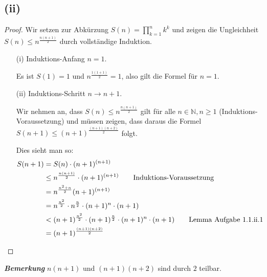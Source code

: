 \documentclass{article}
\begin{document}
\subsection*{(ii)}
\begin{proof}
  Wir setzen zur Abkürzung \(S(n)=\prod_{k=1}^n{k^k}\) und zeigen die
  Ungleichheit \(S(n) \leq n^{\frac{n(n+1)}{2}}\) durch vollständige
  Induktion.

\begin{itemize}
\item[(i)] Induktions-Anfang \(n=1\).

  Es ist \(S(1)=1\) und \(n^{\frac{1(1+1)}{2}} = 1\), also gilt die Formel für \(n=1\).
\item[(ii)] Induktions-Schritt \(n \rightarrow n+1\).

  Wir nehmen an, dass \(S(n)\leq n^{\frac{n(n+1)}{2}}\) gilt für alle
  \(n \in \mathbb{N}, n \geq 1\) (Induktions-Voraussetzung) und müssen
  zeigen, dass daraus die Formel \(S(n+1) \leq (n+1)^{\frac{(n+1)(n+2)}{2}}\)
  folgt.

  Dies sieht man so:
\begin{align*}
  S(n+1) &= S(n) \cdot (n+1)^{(n+1)} \\
         &\leq n^{\frac{n(n+1)}{2}} \cdot (n+1)^{(n+1)}
           \tag*{Induktions-Voraussetzung} \\
         &= n^{\frac{n^2+n}{2}}(n+1)^{(n+1)} \\
  &= n^{\frac{n^2}{2}} \cdot n^{\frac{n}{2}} \cdot (n+1)^n \cdot (n+1)
  \\
  &< (n+1)^{\frac{n^2}{2}} \cdot (n+1)^{\frac{n}{2}} \cdot (n+1)^n
    \cdot (n+1) \tag*{\text{Lemma Aufgabe 1.1.ii.1}}\\
  &= (n+1)^{\frac{(n+1)(n+2)}{2}}
\end{align*}
\end{itemize}
\end{proof}

\textbf{\textit{Bemerkung}} \(n(n+1)\) und \((n+1)(n+2)\) sind durch \(2\)
teilbar.
\end{document}
